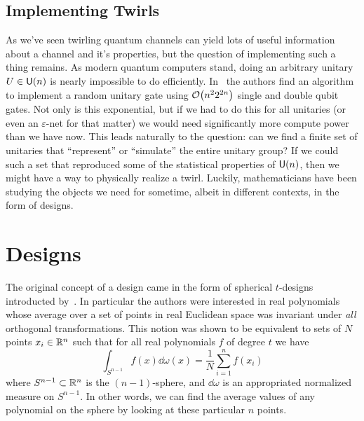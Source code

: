 \documentclass[11pt,english]{article}
\theoremstyle{definition}
\begin{document}
\subsection{Implementing Twirls}

As we've seen twirling quantum channels can yield lots of useful information about a channel and it's properties, but the question of implementing such a thing remains.
As modern quantum computers stand, doing an arbitrary unitary $U\in\mathsf{U}(n)$ is nearly impossible to do efficiently.
In~\cite{pseudo-random} the authors find an algorithm to implement a random unitary gate using $\order{n^2 2^{2n}}$ single and double qubit gates.
Not only is this exponential, but if we had to do this for all unitaries (or even an $\varepsilon$-net for that matter) we would need significantly more compute power than we have now.
This leads naturally to the question: can we find a finite set of unitaries that ``represent'' or ``simulate'' the entire unitary group?
If we could such a set that reproduced some of the statistical properties of $\mathsf{U}(n)$, then we might have a way to physically realize a twirl.
Luckily, mathematicians have been studying the objects we need for sometime, albeit in different contexts, in the form of designs.

\section{Designs}

The original concept of a design came in the form of spherical $t$-designs introducted by~\cite{spherical-designs}.
In particular the authors were interested in real polynomials whose average over a set of points in real Euclidean space was invariant under \emph{all} orthogonal transformations.
This notion was shown to be equivalent to sets of $N$ points $x_i\in\mathbb{R}^n$ such that for all real polynomials $f$ of degree $t$ we have
\begin{equation}
  \int_{S^{n-1}} f(x)\dd{\omega(x)} = \frac{1}{N}\sum_{i = 1}^n f(x_i)
\end{equation}
where $S^{n-1}\subset \mathbb{R}^n$ is the $(n-1)$-sphere, and $\dd{\omega}$ is an appropriated normalized measure on $S^{n-1}$.
In other words, we can find the average values of any polynomial on the sphere by looking at these particular $n$ points.
\end{document}
